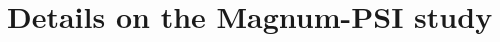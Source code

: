 \documentclass[]{yorkThesis}  %
\begin{document}
\appendix

%

\chapter{Details on the Magnum-PSI study}\label{appendix2}


%

{}  %


\end{document}
